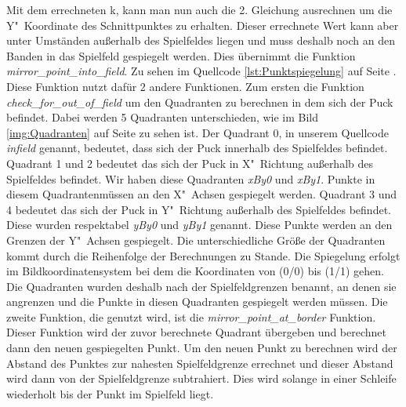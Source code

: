 Mit dem errechneten k, kann man nun auch die 2. Gleichung ausrechnen um die Y"~Koordinate des Schnittpunktes zu erhalten. Dieser errechnete Wert kann aber unter Umständen außerhalb des Spielfeldes liegen und muss deshalb noch an den Banden in das Spielfeld gespiegelt werden. Dies übernimmt die Funktion \textit{mirror\_point\_into\_field}. Zu sehen im Quellcode \ref{lst:Punktspiegelung} auf Seite \pageref{lst:Punktspiegelung}. Diese Funktion nutzt dafür 2 andere Funktionen. Zum ersten die Funktion \textit{check\_for\_out\_of\_field} um den Quadranten zu berechnen in dem sich der Puck befindet. Dabei werden 5 Quadranten unterschieden, wie im Bild \ref{img:Quadranten} auf Seite \pageref{img:Quadranten} zu sehen ist. Der Quadrant 0, in unserem Quellcode \textit{infield} genannt, bedeutet, dass sich der Puck innerhalb des Spielfeldes befindet. Quadrant 1 und 2 bedeutet das sich der Puck in X"~Richtung außerhalb des Spielfeldes befindet. Wir haben diese Quadranten \textit{xBy0} und \textit{xBy1}. Punkte in diesem Quadrantenmüssen an den X"~Achsen gespiegelt werden. Quadrant 3 und 4 bedeutet das sich der Puck in Y"~Richtung außerhalb des Spielfeldes befindet. Diese wurden respektabel \textit{yBy0} und \textit{yBy1} genannt. Diese Punkte werden an den Grenzen der Y"~Achsen gespiegelt. Die unterschiedliche Größe der Quadranten kommt durch die Reihenfolge der Berechnungen zu Stande. Die Spiegelung erfolgt im Bildkoordinatensystem bei dem die Koordinaten von (0/0) bis (1/1) gehen. Die Quadranten wurden deshalb nach der Spielfeldgrenzen benannt, an denen sie angrenzen und die Punkte in diesen Quadranten gespiegelt werden müssen.
Die zweite Funktion, die genutzt wird, ist die \textit{mirror\_point\_at\_border} Funktion. Dieser Funktion wird der zuvor berechnete Quadrant übergeben und berechnet dann den neuen gespiegelten Punkt. Um den neuen Punkt zu berechnen wird der Abstand des Punktes zur nahesten Spielfeldgrenze errechnet und dieser Abstand wird dann von der Spielfeldgrenze subtrahiert. Dies wird solange in einer Schleife wiederholt bis der Punkt im Spielfeld liegt.
